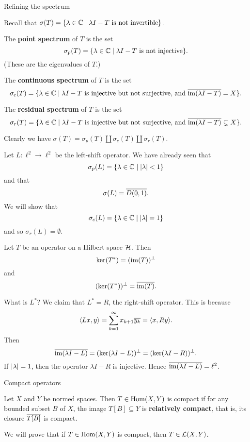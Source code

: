 Refining the spectrum

Recall that $\sigma(T) = \{ \lambda\in\mathbb{C} \mid \lambda I-T \text{ is not invertible} \}$.

\begin{defn}
  \lv
  \begin{enum}
    \io
    The \textbf{point spectrum} of $T$ is the set
    \[ \sigma_p(T) = \{ \lambda \in \mathbb{C} \mid \lambda I-T \text{ is not injective} \}. \]
    (These are the eigenvalues of $T$.)

    \io
    The \textbf{continuous spectrum} of $T$ is the set
    \[ \sigma_c(T) = \{ \lambda \in \mathbb{C} \mid \lambda I-T \text{ is injective but not surjective, and } \overline{\operatorname{im}(\lambda I-T)}=X\}. \]

    \io
    The \textbf{residual spectrum} of $T$ is the set
    \[ \sigma_r(T) = \{ \lambda \in \mathbb{C} \mid \lambda I-T \text{ is injective but not surjective, and } \overline{\operatorname{im}(\lambda I-T)} \subsetneq X\}. \]
  \end{enum}
  Clearly we have $\sigma(T) = \sigma_p(T) \amalg \sigma_c(T) \amalg \sigma_r(T)$.
\end{defn}

\begin{exam}
  Let $L: \ell^2 \to \ell^2$ be the left-shift operator.
  We have already seen that
  \[ \sigma_p(L) = \{ \lambda \in \mathbb{C} \mid \left\lvert \lambda \right\rvert<1 \} \]
  and that
  \[ \sigma(L) = \overline{D(0,1)}. \]
  We will show that
  \[ \sigma_c(L) = \{ \lambda \in \mathbb{C} \mid \left\lvert \lambda \right\rvert=1 \} \]
  and so $\sigma_r(L) = \emptyset$.

  \begin{exer}
    Let $T$ be an operator on a Hilbert space $\mathcal{H}$.
    Then
    \[ \ker(T^*) = (\operatorname{im}(T))^\perp \]
    and
    \[ (\ker(T^*))^\perp = \overline{\operatorname{im}(T)}. \]
  \end{exer}

  What is $L^*$?
  We claim that $L^*=R$, the right-shift operator.
  This is because
  \[ {\left\langle Lx,y \right\rangle} = \sum_{k=1}^\infty x_{k+1}\overline{y_k} = {\left\langle x,Ry \right\rangle}. \]
  Then
  \[ \overline{\operatorname{im}(\lambda I-L)} = (\ker(\lambda I-L))^\perp = (\ker(\lambda I-R))^\perp. \]
  If $\left\lvert \lambda \right\rvert=1$, then the operator $\lambda I-R$ is injective.
  Hence $\overline{\operatorname{im}(\lambda I-L)}=\ell^2$.
\end{exam}

Compact operators

\begin{defn}
  Let $X$ and $Y$ be normed spaces.
  Then $T \in \operatorname{Hom}(X,Y)$ is compact if for any bounded subset $B$ of $X$, the image $T[B] \subseteq Y$ is \textbf{relatively compact}, that is, its closure $\overline{T[B]}$ is compact.
\end{defn}

\begin{rmk}
  We will prove that if $T \in \operatorname{Hom}(X,Y)$ is compact, then $T \in \mathcal{L}(X,Y)$.
\end{rmk}
